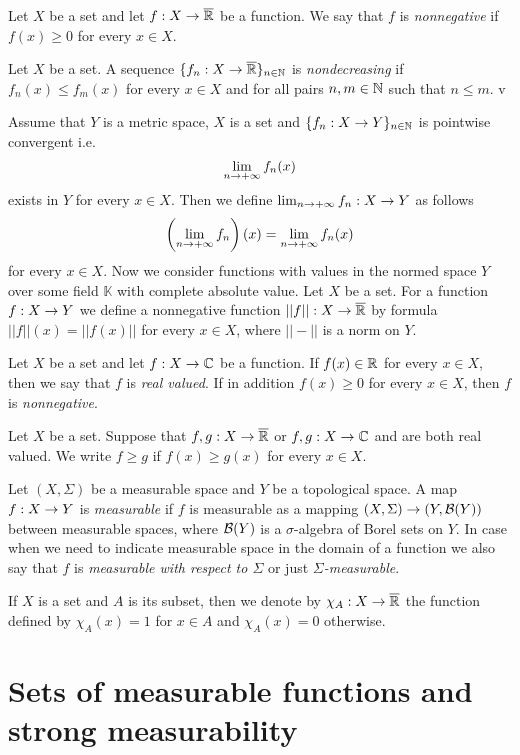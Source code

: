 \begin{definition}
Let $X$ be a set and let $f:X\rightarrow \overline{{\mathbb R}}$ be a function. We say that $f$ is \textit{nonnegative} if $f(x) \geq 0$ for every $x\in X$.
\end{definition}

\begin{definition}
Let $X$ be a set. A sequence $\{f_n:X\rightarrow \overline{{\mathbb R}}\}_{n\in {\mathbb N}}$ is \textit{nondecreasing} if $f_n(x) \leq f_m(x)$ for every $x\in X$ and for all pairs $n, m\in {\mathbb N}$ such that $n\leq m$.
v\end{definition}
\noindent
Assume that $Y$ is a metric space, $X$ is a set and $\{f_n:X\rightarrow Y\}_{n\in {\mathbb N}}$ is pointwise convergent i.e.
$$\lim_{n\rightarrow +\infty}f_n(x)$$
exists in $Y$ for every $x\in X$. Then we define $\lim_{n\rightarrow +\infty}f_n:X\rightarrow Y$ as follows
$$\left(\lim_{n\rightarrow +\infty}f_n\right)(x) = \lim_{n\rightarrow +\infty}f_n(x)$$
for every $x\in X$. Now we consider functions with values in the normed space $Y$ over some field $\mathbb{K}$ with complete absolute value. Let $X$ be a set. For a function $f:X\rightarrow Y$ we define a nonnegative function $||f||:X\rightarrow \overline{{\mathbb R}}$ by formula $||f||(x) = ||f(x)||$ for every $x\in X$, where $||-||$ is a norm on $Y$.

\begin{definition}
Let $X$ be a set and let $f:X\rightarrow {\mathbb C}$ be a function. If $f(x)\in {\mathbb R}$ for every $x\in X$, then we say that $f$ is \textit{real valued}. If in addition $f(x)\geq 0$ for every $x\in X$, then $f$ is \textit{nonnegative}.
\end{definition}
\noindent
Let $X$ be a set. Suppose that $f,g:X\rightarrow \overline{{\mathbb R}}$ or $f,g:X\rightarrow {\mathbb C}$ and are both real valued. We write $f\geq g$ if $f(x)\geq g(x)$ for every $x\in X$.

\begin{definition}
Let $(X,\Sigma)$ be a measurable space and $Y$ be a topological space. A map $f:X\rightarrow Y$ is \textit{measurable} if $f$ is measurable as a mapping $(X,\Sigma)\rightarrow (Y,{\mathcal B}(Y))$ between measurable spaces, where ${\mathcal B}(Y)$ is a $\sigma$-algebra of Borel sets on $Y$. In case when we need to indicate measurable space in the domain of a function we also say that $f$ is \textit{measurable with respect to $\Sigma$} or just \textit{$\Sigma$-measurable}. 
\end{definition}
\noindent
If $X$ is a set and $A$ is its subset, then we denote by $\chi_A:X\rightarrow \overline{{\mathbb R}}$ the function defined by $\chi_A(x)=1$ for $x\in A$ and $\chi_A(x)=0$ otherwise.

\section{Sets of measurable functions and strong measurability}

